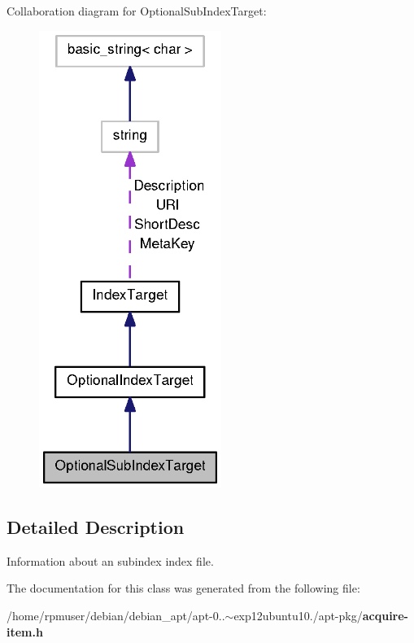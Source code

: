 \-Collaboration diagram for \-Optional\-Sub\-Index\-Target\-:
\nopagebreak
\begin{figure}[H]
\begin{center}
\leavevmode
\includegraphics[width=168pt]{classOptionalSubIndexTarget__coll__graph}
\end{center}
\end{figure}


\subsection{\-Detailed \-Description}
\-Information about an subindex index file. 

\-The documentation for this class was generated from the following file\-:\begin{DoxyCompactItemize}
\item 
/home/rpmuser/debian/debian\-\_\-apt/apt-\/0..$\sim$exp12ubuntu10./apt-\/pkg/{\bf acquire-\/item.\-h}\end{DoxyCompactItemize}
